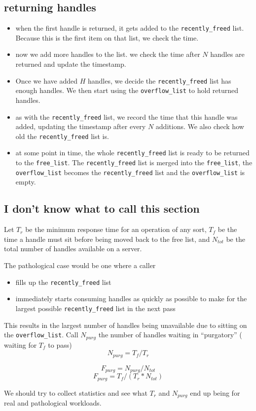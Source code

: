 \documentclass[10pt]{article} %
\begin{document}
\subsection{returning handles}
\begin {itemize}
\item when the first handle is returned, it gets added to the
    \texttt{recently\_freed} list. Because this is the first item on that
    list, we check the time. 
\item  now we add more handles to the list.  we check the time after $N$            handles are returned and update the timestamp.
\item  Once we have added $H$ handles, we decide the \texttt{recently\_freed}
    list has enough handles.  We then start using the
    \texttt{overflow\_list} to hold returned handles.
\item  as with the \texttt{recently\_freed} list, we record the time that
    this handle was added, updating the timestamp after every $N$
    additions.  We also check how old the \texttt{recently\_freed} list is. 
\item  at some point in time, the whole \texttt{recently\_freed} list is ready
    to be returned to the \texttt{free\_list}.  The \texttt{recently\_freed}
    list is merged into the \texttt{free\_list}, the \texttt{overflow\_list}
    becomes the \texttt{recently\_freed} list and the  \texttt{overflow\_list}
    is empty.
\end{itemize}

\subsection{I don't know what to call this section}

Let $T_{r}$ be the minimum response time for an operation of any sort,
$T_{f}$ be the time a handle must sit before being moved back to the free list, and $N_{tot}$ be the total number of handles available on a server.

The pathological case would be one where a caller
\begin{itemize}
\item fills up the \texttt{recently\_freed} list
\item immediately starts consuming handles as quickly as possible to make for
 the largest possible \texttt{recently\_freed} list in the next pass
\end{itemize}

This results in the largest number of handles being unavailable due to sitting
on the \texttt{overflow\_list}.  Call $N_{purg}$ the number of handles waiting
in ``purgatory'' ( waiting for $T_{f}$ to pass) 
\begin{equation}
N_{purg} = T_{f} / T_{r}
\end{equation}

\begin{equation}
F_{purg} = N_{purg} / N_{tot}
\end{equation}
\begin{equation}
F_{purg} = T_{f} / (T_{r} * N_{tot})
\end{equation}

We should try to collect statistics and see what $T_{r}$ and $N_{purg}$ end up being for real and pathological workloads.
\end{document}
